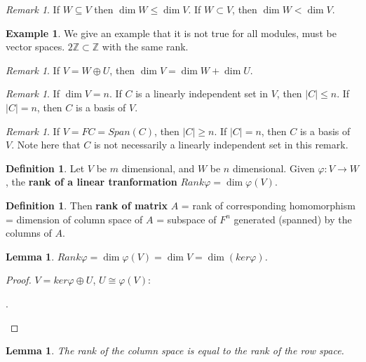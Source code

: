 \documentclass[9pt,reqno,twoside]{amsbook}
\theoremstyle{plain}
\numberwithin{section}{chapter}
\numberwithin{equation}{chapter}
\newtheorem{lem}[theorem]{Lemma}
\theoremstyle{definition}
\newtheorem{Def}[theorem]{Definition}
\newtheorem{Ex}[theorem]{Example}
\theoremstyle{remark}
\newtheorem{rem}[theorem]{Remark}
\theoremstyle{plain}
\newcommand{\sub}{\subseteq}
\newcommand{\z}{\mathbb{Z}}
\renewcommand{\leq}{\leqslant}
\renewcommand{\geq}{\geqslant}
\renewcommand{\phi}{\varphi}
\begin{document}
\begin{rem}
If $W \sub V$ then $\dim W \leq \dim V$. If $W \subset V$, then $\dim W < \dim V$. 
\end{rem}

\begin{Ex}
We give an example that it is not true for all modules, must be vector spaces. 
$2\z \subset \z$ with the same rank. 
\end{Ex}

\begin{rem}
If $V = W \oplus U$, then $\dim V = \dim W + \dim U$. 
\end{rem}


\begin{rem}
If $\dim V = n$. If $C$ is a linearly independent set in $V$, then $|C| \leq n$. If $|C| = n$, then $C$ is a basis of $V$. 
\end{rem}

\begin{rem}
If $V  =FC = Span(C)$, then $|C| \geq n$. If $|C| = n$, then $C$ is a basis of $V$. Note here that $C$ is not necessarily a linearly independent set in this remark. 
\end{rem}


\begin{Def}
Let $V$ be $m$ dimensional, and $W$ be $n$ dimensional. Given $\phi:V \to W$, the \textbf{rank of a linear tranformation} $Rank\phi = \dim \phi(V)$. 
\end{Def}

\begin{Def}
Then \textbf{rank of matrix }$A$ = rank of corresponding homomorphism = dimension of column space of $A$ = subspace of $F^n$ generated (spanned) by the columns of $A$. 
\end{Def}

\begin{lem}
$Rank\phi = \dim\phi(V) = \dim V = \dim (ker\phi)$. 
\end{lem}

\begin{proof}
$V = ker\phi \oplus U$, $U \cong \phi(V)$:
\begin{center}
. 
\end{center}
\end{proof}

\begin{lem}
The rank of the column space is equal to the rank of the row space. 
\end{lem}
\end{document}
